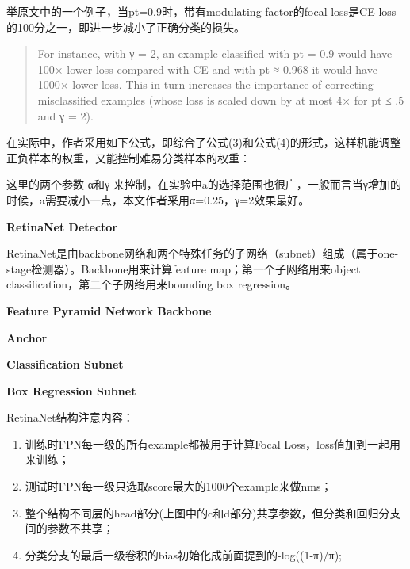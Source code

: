 举原文中的一个例子，当pt=0.9时，带有modulating factor的focal loss是CE
loss的100分之一，即进一步减小了正确分类的损失。

\begin{quote}
For instance, with γ = 2, an example classified with pt = 0.9 would have
100× lower loss compared with CE and with pt ≈ 0.968 it would have 1000×
lower loss. This in turn increases the importance of correcting
misclassified examples (whose loss is scaled down by at most 4× for pt ≤
.5 and γ = 2).
\end{quote}

在实际中，作者采用如下公式，即综合了公式(3)和公式(4)的形式，这样机能调整正负样本的权重，又能控制难易分类样本的权重：

\begin{figure}
\centering
\caption{}
\end{figure}

这里的两个参数 α和γ
来控制，在实验中a的选择范围也很广，一般而言当γ增加的时候，a需要减小一点，本文作者采用α=0.25，γ=2效果最好。

\textbf{RetinaNet Detector}

RetinaNet是由backbone网络和两个特殊任务的子网络（subnet）组成（属于one-stage检测器）。Backbone用来计算feature
map；第一个子网络用来object classification，第二个子网络用来bounding box
regression。

\textbf{Feature Pyramid Network Backbone}

\begin{figure}
\centering
\caption{}
\end{figure}

\textbf{Anchor}

\textbf{Classification Subnet}

\textbf{Box Regression Subnet}

\begin{figure}
\centering
\caption{}
\end{figure}

\begin{figure}
\centering
\caption{}
\end{figure}

RetinaNet结构注意内容：

\begin{enumerate}
\def\labelenumi{\arabic{enumi}.}
\item
  训练时FPN每一级的所有example都被用于计算Focal
  Loss，loss值加到一起用来训练；
\item
  测试时FPN每一级只选取score最大的1000个example来做nms；
\item
  整个结构不同层的head部分(上图中的c和d部分)共享参数，但分类和回归分支间的参数不共享；
\item
  分类分支的最后一级卷积的bias初始化成前面提到的-log((1-π)/π);
\end{enumerate}

